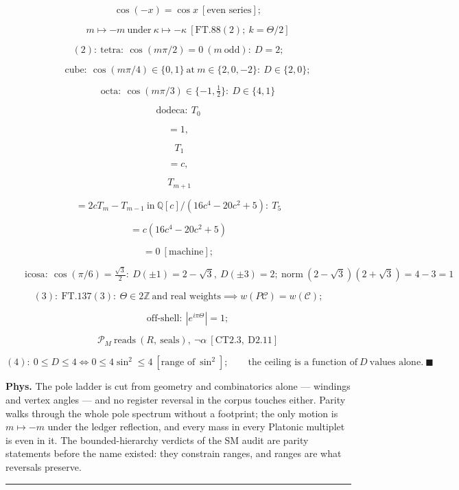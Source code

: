 \begin{theorem}
\[
\qquad \cos(-x)=\cos x\ [\text{even series}];
\]

\[
\qquad m\mapsto-m\ \text{under}\ \kappa\mapsto-\kappa\ [\mathrm{FT.88}(2);\ k=\Theta/2]
\]

\[
(2):\ \text{tetra}:\ \cos(m\pi/2)=0\ (m\ \text{odd}):\ D=2;
\]

\[
\qquad \text{cube}:\ \cos(m\pi/4)\in\{0,1\}\ \text{at}\ m\in\{2,0,-2\}:\ D\in\{2,0\};
\]

\[
\qquad \text{octa}:\ \cos(m\pi/3)\in\{-1,\tfrac12\}:\ D\in\{4,1\}
\]

\[
\text{dodeca}:\ T_0
\]

\[
= 1,
\]

\[
\ T_1
\]

\[
= c,
\]

\[
\ T_{m+1}
\]

\[
= 2cT_m-T_{m-1}\ \text{in}\ \mathbb Q[c]/(16c^4-20c^2+5):\ T_5
\]

\[
= c(16c^4-20c^2+5)
\]

\[
= 0\ [\text{machine}];
\]

\[
\qquad \text{icosa}:\ \cos(\pi/6)=\tfrac{\sqrt3}2:\ D(\pm1)=2-\sqrt3,\ D(\pm3)=2;\ \text{norm}\ (2-\sqrt3)(2+\sqrt3)=4-3=1
\]

\[
(3):\ \mathrm{FT.137}(3):\ \Theta\in2\mathbb Z\ \text{and real weights}\implies w(P\mathcal C)=w(\mathcal C);
\]

\[
\qquad \text{off-shell}:\ |e^{i\pi\Theta}|=1;
\]

\[
\qquad \mathcal P_M\ \text{reads}\ (R,\ \text{seals}),\ \neg\alpha\ [\mathrm{CT2.3},\ \mathrm{D2.11}]
\]

\[
(4):\ 0\le D\le4\iff0\le4\sin^2\le4\ [\text{range of}\ \sin^2];\qquad\text{the ceiling is a function of}\ D\ \text{values alone}.\ \blacksquare
\]

\textbf{Phys.} The pole ladder is cut from geometry and combinatorics alone — windings and vertex angles — and no register reversal in the corpus touches either. Parity walks through the whole pole spectrum without a footprint; the only motion is $m\mapsto-m$ under the ledger reflection, and every mass in every Platonic multiplet is even in it. The bounded-hierarchy verdicts of the SM audit are parity statements before the name existed: they constrain ranges, and ranges are what reversals preserve.

\vspace{2pt}\noindent\rule{\textwidth}{0.4pt}\vspace{2pt}

\end{theorem}

